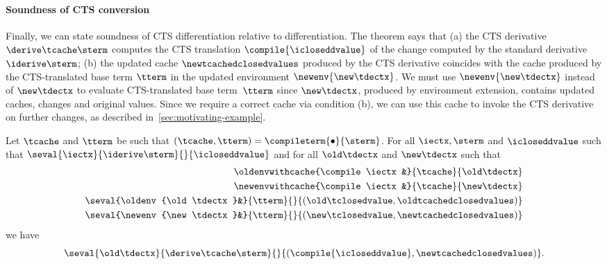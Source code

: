 \paragraph{Soundness of CTS conversion}
Finally, we can state soundness of CTS differentiation relative to differentiation.
The theorem says that (a) the CTS derivative $\derive\tcache\sterm$ computes the
CTS translation $\compile{\icloseddvalue}$ of the
change computed by the standard derivative $\iderive\sterm$; (b) the updated
cache $\newtcachedclosedvalues$ produced by
the CTS derivative coincides with the cache produced by the CTS-translated base
term $\tterm$ in the updated environment $\newenv{\new\tdectx}$.
We must use $\newenv{\new\tdectx}$ instead of $\new\tdectx$ to evaluate
CTS-translated base term~$\tterm$ since $\new\tdectx$, produced by environment extension,
contains updated caches, changes and original values.
Since we require a correct cache via condition (b), we can use this cache
to invoke the CTS derivative on further changes, as described
in~\cref{sec:motivating-example}.

\begin{theorem}
  \label{thm:soundness-compiled-changesfinal}
  Let $\tcache$ and $\tterm$ be such that 
  $(\tcache, \tterm) = \compileterm{\bullet}{\sterm}$.
  For all $\iectx, \sterm$ and $\icloseddvalue$ such that
  $\seval{\iectx}{\iderive\sterm}{}{\icloseddvalue}$ and
  for all $\old\tdectx$ and $\new\tdectx$ such that
  \begin{align*}
  \oldenvwithcache{\compile\iectx&}{\tcache}{\old\tdectx}\\
  \newenvwithcache{\compile\iectx&}{\tcache}{\new\tdectx}\\
  \seval{\oldenv{\old\tdectx}&}{\tterm}{}{(\old\tclosedvalue, \oldtcachedclosedvalues)}\\
  \seval{\newenv{\new\tdectx}&}{\tterm}{}{(\new\tclosedvalue, \newtcachedclosedvalues)}
  \end{align*}
  we have
  \[
  \seval{\old\tdectx}{\derive\tcache\sterm}{}{(\compile{\icloseddvalue}, \newtcachedclosedvalues)}
  .\]
\end{theorem}

